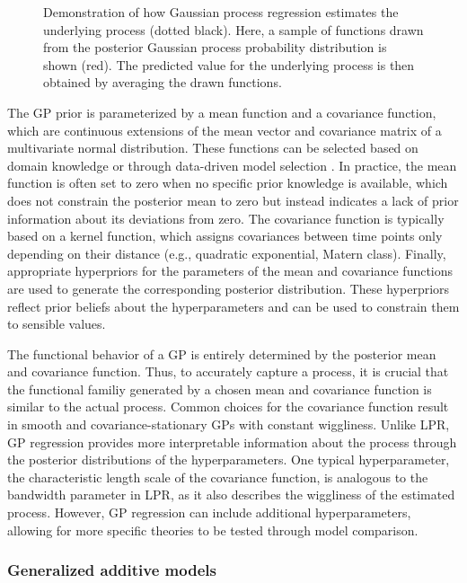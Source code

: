 \documentclass[man, floatsintext]{apa7}
\begin{document}
\begin{figure}[!ht]
  \caption{Demonstration of how Gaussian process regression estimates the
    underlying process (dotted black). Here, a sample of functions drawn from
    the
    posterior Gaussian process probability distribution is shown (red). The
    predicted value for the underlying process is then obtained by averaging
    the
    drawn functions.}
  \label{fig:gp_dem}
\end{figure}

The GP prior is parameterized by a mean function and a covariance function,
which are continuous extensions of the mean vector and covariance matrix of a
multivariate normal distribution. These functions can be selected based on
domain knowledge or through data-driven model selection
\parencite{richardson_gaussian_2017, abdessalem_automatic_2017}. In practice,
the mean function is often set to zero when no specific prior knowledge is
available, which does not constrain the posterior mean to zero but instead
indicates a lack of prior information about its deviations from zero.
The covariance function is typically based on a kernel function, which assigns
covariances between time points only depending on their distance
(e.g., quadratic exponential, Matern class). Finally, appropriate hyperpriors
for the parameters of the mean and covariance functions are used to generate
the corresponding posterior distribution. These hyperpriors reflect
prior beliefs about the hyperparameters and can be used to constrain them to
sensible values.

The functional behavior of a GP is entirely determined by the posterior mean
and covariance function. Thus, to accurately capture a process, it is crucial
that the functional familiy generated by a chosen mean and covariance function
is similar to the actual process.
Common choices for the covariance function result in smooth and
covariance-stationary GPs with constant wiggliness. Unlike LPR, GP
regression provides more interpretable information about the process through
the posterior distributions of the hyperparameters.
One typical hyperparameter, the characteristic length scale of the covariance
function, is analogous to the bandwidth parameter in LPR, as it also describes
the wiggliness of the estimated process. However, GP regression can
include additional hyperparameters, allowing for more specific theories to be
tested through model comparison.

\subsubsection{Generalized additive models}
\end{document}
